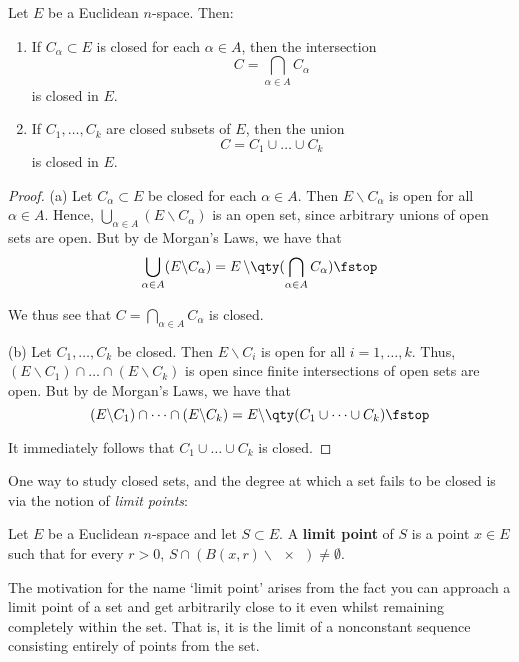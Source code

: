 \begin{proposition}
  Let \( E \) be a Euclidean \( n \)-space. Then:
  \begin{enumerate}[label=(\alph*)]
  \item If \( C_\alpha\subset E \) is closed for each \( \alpha\in A \), then the intersection
    \[ C=\bigcap_{\alpha\in A}C_\alpha \]
    is closed in \( E \).
  \item If \( C_1,\dots,C_k \) are closed subsets of \( E \), then the union
    \[ C=C_1\cup\dots\cup C_k \]
    is closed in \( E \).
  \end{enumerate}
\end{proposition}
\begin{proof}
  (a) Let \( C_\alpha\subset E \) be closed for each \( \alpha\in A \). Then \( E\backslash C_\alpha \) is open for all \( \alpha\in A \). Hence, \( \bigcup_{\alpha\in A}(E\backslash C_\alpha) \) is an open set, since arbitrary unions of open sets are open. But by de Morgan's Laws, we have that
  \[ \bigcup_{\alpha\in A}(E\backslash C_\alpha)=E\,\backslash\qty(\bigcap_{\alpha\in A}C_\alpha)\fstop \]
  
  We thus see that \( C=\bigcap_{\alpha\in A}C_\alpha \) is closed.

  \vspace{3mm}

  (b) Let \( C_1,\dots, C_k \) be closed. Then \( E\backslash C_i \) is open for all \( i=1,\dots,k \). Thus, \( (E\backslash C_1)\cap\dots\cap(E\backslash C_k) \) is open since finite intersections of open sets are open. But by de Morgan's Laws, we have that
  \[ (E\backslash C_1)\cap\dots\cap(E\backslash C_k)=E\backslash\qty(C_1\cup\dots\cup C_k)\fstop \]
  
  It immediately follows that \( C_1\cup\dots\cup C_k \) is closed.
\end{proof}

One way to study closed sets, and the degree at which a set fails to be closed is via the notion of \emph{limit points}:

\begin{definition}
  Let \( E \) be a Euclidean \( n \)-space and let \( S\subset E \). A \textbf{limit point} of \( S \) is a point \( x\in E \) such that for every \( r>0 \), \( S\cap (B(x,r)\backslash\qty{x})\neq\emptyset \).
\end{definition}

The motivation for the name `limit point' arises from the fact you can approach a limit point of a set and get arbitrarily close to it even whilst remaining completely within the set. That is, it is the limit of a nonconstant sequence consisting entirely of points from the set.

